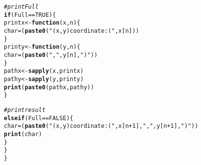 \documentclass[english]{article}\usepackage[]{graphicx}\usepackage[]{color}
\makeatletter
\newcommand{\hlnum}[1]{\textcolor[rgb]{0.686,0.059,0.569}{#1}}%
\newcommand{\hlstr}[1]{\textcolor[rgb]{0.192,0.494,0.8}{#1}}%
\newcommand{\hlcom}[1]{\textcolor[rgb]{0.678,0.584,0.686}{\textit{#1}}}%
\newcommand{\hlopt}[1]{\textcolor[rgb]{0,0,0}{#1}}%
\newcommand{\hlstd}[1]{\textcolor[rgb]{0.345,0.345,0.345}{#1}}%
\newcommand{\hlkwa}[1]{\textcolor[rgb]{0.161,0.373,0.58}{\textbf{#1}}}%
\newcommand{\hlkwb}[1]{\textcolor[rgb]{0.69,0.353,0.396}{#1}}%
\newcommand{\hlkwc}[1]{\textcolor[rgb]{0.333,0.667,0.333}{#1}}%
\newcommand{\hlkwd}[1]{\textcolor[rgb]{0.737,0.353,0.396}{\textbf{#1}}}%
\newenvironment{kframe}{%
 \def\at@end@of@kframe{}%
 \ifinner\ifhmode%
  \def\at@end@of@kframe{\end{minipage}}%
  \begin{minipage}{\columnwidth}%
 \fi\fi%
 \def\FrameCommand##1{\hskip\@totalleftmargin \hskip-\fboxsep
 \colorbox{shadecolor}{##1}\hskip-\fboxsep
     \hskip-\linewidth \hskip-\@totalleftmargin \hskip\columnwidth}%
 \MakeFramed {\advance\hsize-\width
   \@totalleftmargin\z@ \linewidth\hsize
   \@setminipage}}%
 {\par\unskip\endMakeFramed%
 \at@end@of@kframe}
\newenvironment{knitrout}{}{} %
\makeatother
\begin{document}
\begin{knitrout}
\begin{kframe}
\begin{alltt}
        \hlcom{#print Full     }
        \hlkwa{if} \hlstd{(Full} \hlopt{==} \hlnum{TRUE}\hlstd{) \{}
                \hlstd{printx} \hlkwb{<-} \hlkwa{function}\hlstd{(}\hlkwc{x}\hlstd{,}\hlkwc{n}\hlstd{) \{}
                        \hlstd{char} \hlkwb{=} \hlstd{(}\hlkwd{paste0}\hlstd{(}\hlstr{"(x,y) coordinate : ("}\hlstd{, x[n]))}
                \hlstd{\}}
                \hlstd{printy} \hlkwb{<-} \hlkwa{function}\hlstd{(}\hlkwc{y}\hlstd{,}\hlkwc{n}\hlstd{) \{}
                        \hlstd{char} \hlkwb{=} \hlstd{(}\hlkwd{paste0}\hlstd{(}\hlstr{","}\hlstd{, y[n],} \hlstr{")"}\hlstd{))}
                \hlstd{\}}
                \hlstd{pathx} \hlkwb{<-} \hlkwd{sapply}\hlstd{(x,printx)}
                \hlstd{pathy} \hlkwb{<-} \hlkwd{sapply}\hlstd{(y,printy)}
                \hlkwd{print}\hlstd{(}\hlkwd{paste0}\hlstd{(pathx, pathy))}
                \hlstd{\}}

        \hlcom{#print result     }
        \hlkwa{else if} \hlstd{(Full} \hlopt{==} \hlnum{FALSE}\hlstd{) \{}
                \hlstd{char} \hlkwb{=} \hlstd{(}\hlkwd{paste0}\hlstd{(}\hlstr{"(x,y) coordinate : ("}\hlstd{, x[n}\hlopt{+}\hlnum{1}\hlstd{],} \hlstr{","}\hlstd{, y[n}\hlopt{+}\hlnum{1}\hlstd{],} \hlstr{")"}\hlstd{))}
                \hlkwd{print}\hlstd{(char)}
                \hlstd{\}}
        \hlstd{\}}
\hlstd{\}}


\end{alltt}
\end{kframe}
\end{knitrout}
\end{document}
